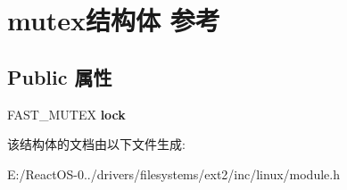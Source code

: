 \hypertarget{structmutex}{}\section{mutex结构体 参考}
\label{structmutex}
\subsection*{Public 属性}
\begin{DoxyCompactItemize}
\item 
\mbox{\label{structmutex_a164436761b3bb23a886fe4bf69f6a082}} 
F\+A\+S\+T\+\_\+\+M\+U\+T\+EX {\bfseries lock}
\end{DoxyCompactItemize}


该结构体的文档由以下文件生成\+:\begin{DoxyCompactItemize}
\item 
E\+:/\+React\+O\+S-\/0../drivers/filesystems/ext2/inc/linux/module.\+h\end{DoxyCompactItemize}
